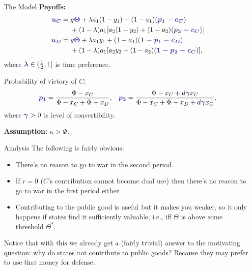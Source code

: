 \documentclass[ignorenonframetext,c,12pt]{beamer}
\newcommand{\blue}[1]{{\color{blendedblue}#1}}
\newcommand{\myemph}[1]{\bf{\blue{#1}}}
\renewcommand{\bf}[1]{{\boldsymbol{#1}}}
\begin{document}
\begin{frame}{The Model}
  \textbf{Payoffs:}\vspace{-1em}
  \begin{align*}
    \myemph{u_C} ={}& g \myemph{\Theta} + \lambda a_1 (1 - y_1) + (1 - a_1) (\myemph{p_1 - c_C}) \\
    & + (1 - \lambda) a_1 [a_2 (1 - y_2) + (1 - a_2) (\myemph{p_2 - c_C})] \\
    \myemph{u_D} ={}& g \myemph{\Theta} + \lambda a_1 y_1 + (1 - a_1) (\myemph{1 - p_1 - c_D}) \\
    & + (1 - \lambda) a_1 [a_2 y_2 + (1 - a_2) (\myemph{1 - p_2 - c_C})],
  \end{align*}
  where $\myemph{\lambda} \in (\frac12, 1]$ is time preference.

  Probability of victory of $C$:
  \begin{align*}
    & \myemph{p_1} = \frac{\Phi - x_C}{\Phi - x_C + \Phi - x_D},
    & \myemph{p_2} = \frac{\Phi - x_C + d \myemph{\gamma} x_C}{\Phi - x_C + \Phi - x_D + d \myemph{\gamma} x_C},
  \end{align*}
  where $\myemph{\gamma} > 0$ is level of convertibility.

  \textbf{Assumption:} $\kappa > \Phi$.
\end{frame}

\begin{frame}{Analysis}
  The following is fairly obvious:
  \begin{itemize}
    \item There's no reason to go to war in the second period.
    \item If $r = 0$ ($C$'s contribution cannot become dual use) then there's no reason to go to war in the first period either.
    \item Contributing to the public good is useful but it makes you weaker, so it only happens if states find it sufficiently valuable, i.e., iff $\Theta$ is above some threshold $\Theta^*$.
  \end{itemize}

  Notice that with this we already get a (fairly trivial) answer to the motivating question: why do states not contribute to public goods? Because they may prefer to use that money for defense.
\end{frame}
\end{document}

